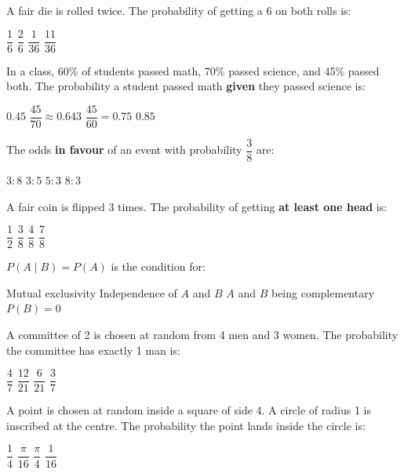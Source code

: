 \documentclass[addpoints]{exam}
\begin{document}
\begin{questions}
\question[1] A fair die is rolled twice. The probability of getting a 6 on both rolls is:
\begin{choices}
    \choice $\dfrac{1}{6}$
    \choice $\dfrac{2}{6}$
    \correctchoice $\dfrac{1}{36}$
    \choice $\dfrac{11}{36}$
\end{choices}

\question[1] In a class, 60\% of students passed math, 70\% passed science, and 45\% passed
both. The probability a student passed math \textbf{given} they passed science is:
\begin{choices}
    \choice $0.45$
    \correctchoice $\dfrac{45}{70} \approx 0.643$
    \choice $\dfrac{45}{60} = 0.75$
    \choice $0.85$
\end{choices}

\question[1] The odds \textbf{in favour} of an event with probability $\dfrac{3}{8}$ are:
\begin{choices}
    \choice $3:8$
    \correctchoice $3:5$
    \choice $5:3$
    \choice $8:3$
\end{choices}

\question[1] A fair coin is flipped 3 times. The probability of getting \textbf{at least one head} is:
\begin{choices}
    \choice $\dfrac{1}{2}$
    \choice $\dfrac{3}{8}$
    \choice $\dfrac{4}{8}$
    \correctchoice $\dfrac{7}{8}$
\end{choices}

\question[1] $P(A \mid B) = P(A)$ is the condition for:
\begin{choices}
    \choice Mutual exclusivity
    \correctchoice Independence of $A$ and $B$
    \choice $A$ and $B$ being complementary
    \choice $P(B) = 0$
\end{choices}

\question[1] A committee of 2 is chosen at random from 4 men and 3 women. The probability
the committee has exactly 1 man is:
\begin{choices}
    \choice $\dfrac{4}{7}$
    \correctchoice $\dfrac{12}{21}$
    \choice $\dfrac{6}{21}$
    \choice $\dfrac{3}{7}$
\end{choices}

\question[1] A point is chosen at random inside a square of side 4. A circle of radius 1 is
inscribed at the centre. The probability the point lands inside the circle is:
\begin{choices}
    \choice $\dfrac{1}{4}$
    \correctchoice $\dfrac{\pi}{16}$
    \choice $\dfrac{\pi}{4}$
    \choice $\dfrac{1}{16}$
\end{choices}


\end{questions}
\end{document}
